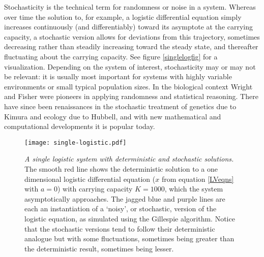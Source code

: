 Stochasticity is the technical term for randomness or noise in a system. %
Whereas over time the solution to, for example, a logistic differential equation simply increases continuously (and differentiably) toward its asymptote at the carrying capacity, a stochastic version allows for deviations from this trajectory, sometimes decreasing rather than steadily increasing toward the steady state, and thereafter fluctuating about the carrying capacity. 
See figure \ref{singlelogfig} for a visualization. %
Depending on the system of interest, stochasticity may or may not be relevant: it is usually most important for systems with highly variable environments or small typical population sizes. 
In the biological context Wright and Fisher were pioneers in applying randomness and statistical reasoning. %
There have since been renaissances in the stochastic treatment of genetics due to Kimura and ecology due to Hubbell, and with new mathematical and computational developments it is popular today. %

\begin{figure}[h]
	\centering
	\texttt{[image: single-logistic.pdf]}
	\caption{\emph{A single logistic system with deterministic and stochastic solutions.} The smooth red line shows the deterministic solution to a one dimensional logistic differential equation ($x$ from equation \ref{LVeqns} with $a=0$) with carrying capacity $K=1000$, which the system asymptotically approaches. The jagged blue and purple lines are each an instantiation of a `noisy', or stochastic, version of the logistic equation, as simulated using the Gillespie algorithm. Notice that the stochastic versions tend to follow their deterministic analogue but with some fluctuations, sometimes being greater than the deterministic result, sometimes being lesser. }
\end{figure} \label{singlelogfig}

